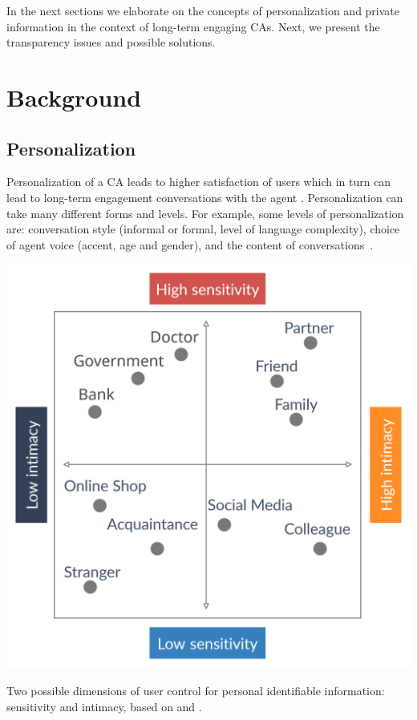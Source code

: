 \documentclass[sigchi-a,nonacm]{acmart}
\begin{document}
In the next sections we elaborate on the concepts of personalization and private information in the context of long-term engaging CAs. Next, we present the transparency issues and possible solutions.

\section{Background} 

\subsection{Personalization}
Personalization of a CA leads to higher satisfaction of users \cite{demberg2011strategy} which in turn can lead to long-term engagement conversations with the agent \cite{Bickmore2005}. Personalization can take many different forms and levels. For example, some levels of personalization are: conversation style (informal or formal, level of language complexity), choice of agent voice (accent, age and gender), and the content of conversations~\cite{kocaballi2019personalization}.

\begin{marginfigure}
  \centering
  \includegraphics[width=\linewidth]{Personal Information intimacy vs sensitivity}
  \caption{Two possible dimensions of user control for personal identifiable information: sensitivity and intimacy, based on \cite{kim2018HowMultilevelPrivacy} and \cite{knijnenburg2013HelpingUsersInformation}.}
  \label{fig:sensitivityvsintimacy}
\end{marginfigure}
\end{document}
